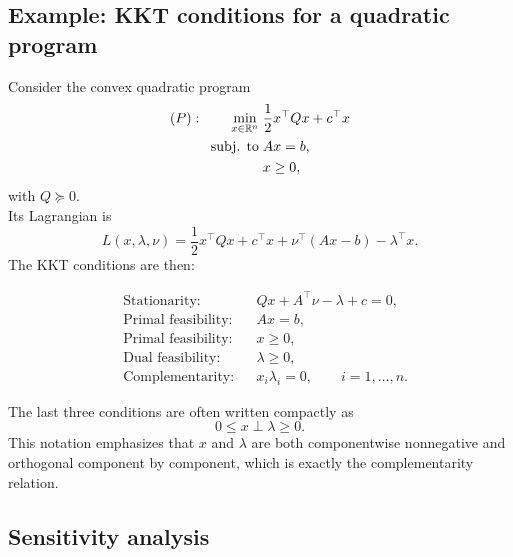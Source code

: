\subsection{Example: KKT conditions for a quadratic program}

Consider the convex quadratic program
\[
\begin{aligned}
(P):\qquad
\min_{x\in\mathbb{R}^n}\;& \frac12 x^\top Qx + c^\top x\\
\text{subj. to}\;& Ax=b,\\
& x\ge 0,
\end{aligned}
\]
with \(Q\succeq 0\).\\
Its Lagrangian is
\[
L(x,\lambda,\nu)
=
\frac12 x^\top Qx + c^\top x + \nu^\top(Ax-b) - \lambda^\top x.
\]
The KKT conditions are then:

\begin{align*}
&\text{Stationarity:} 
&& Qx + A^\top \nu - \lambda + c = 0,\\
&\text{Primal feasibility:} 
&& Ax=b,\\
&\text{Primal feasibility:} 
&& x\ge 0,\\
&\text{Dual feasibility:} 
&& \lambda\ge 0,\\
&\text{Complementarity:} 
&& x_i\lambda_i = 0,\qquad i=1,\dots,n.
\end{align*}

The last three conditions are often written compactly as
\[
0 \le x \perp \lambda \ge 0.
\]
This notation emphasizes that \(x\) and \(\lambda\) are both componentwise nonnegative and orthogonal component by component, which is exactly the complementarity relation.

\subsection{Sensitivity analysis}

